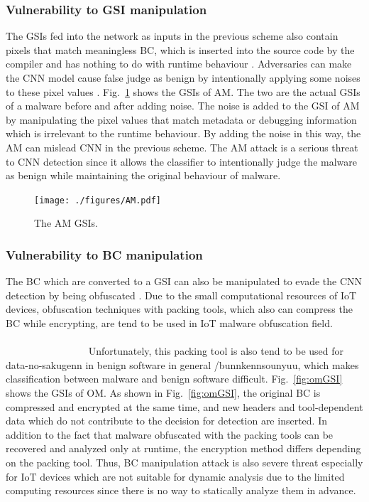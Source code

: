 \documentclass{ieeeaccess}
\newcommand{\myfigurename}{Fig.}
\begin{document}
\subsubsection{Vulnerability to GSI manipulation}
The GSIs fed into the network as inputs in the previous scheme also contain pixels that match meaningless BC, which is inserted into the source code by the compiler and has nothing to do with runtime behaviour \cite{am}.
Adversaries can make the CNN model cause false judge as benign by intentionally applying some noises to these pixel values \cite{am}.
\myfigurename~\ref{fig:amGSI} shows the GSIs of AM.
The two are the actual GSIs of a malware before and after adding noise.
The noise is added to the GSI of AM by manipulating the pixel values that match metadata or debugging information which is irrelevant to the runtime behaviour.
By adding the noise in this way, the AM can mislead CNN in the previous scheme.
The AM attack is a serious threat to CNN detection since it allows the classifier to intentionally judge the malware as benign while maintaining the original behaviour of malware.

\begin{figure}[t]
 \centering
 \texttt{[image: ./figures/AM.pdf]}
 \caption{The AM GSIs.} 
 \label{fig:amGSI}
\end{figure}
\subsubsection{Vulnerability to BC manipulation}
The BC which are converted to a GSI can also be manipulated to evade the CNN detection by being obfuscated \cite{om}.
Due to the small computational resources of IoT devices, obfuscation techniques with packing tools, which also can compress the BC while encrypting, are tend to be used in IoT malware obfuscation field.
~~~~~~~~~~~~~~~~~~~~~~~~~~~~~~~~~~~~~~~~~~~~~~~~~~~~~~~~~~~~~~~~~~~~~~~~~~~~~~~~~~~~~~~~
Unfortunately, this packing tool is also tend to be used for data-no-sakugenn in benign software in general /bunnkennsounyuu, which makes classification between malware and benign software difficult.
\myfigurename~\ref{fig:omGSI} shows the GSIs of OM.
As shown in \myfigurename~\ref{fig:omGSI}, the original BC is compressed and encrypted at the same time, and new headers and tool-dependent data which do not contribute to the decision for detection are inserted.
In addition to the fact that malware obfuscated with the packing tools can be recovered and analyzed only at runtime, the encryption method differs depending on the packing tool.
Thus, BC manipulation attack is also severe threat especially for IoT devices which are not suitable for dynamic analysis due to the limited computing resources since there is no way to statically analyze them in advance.
\end{document}
